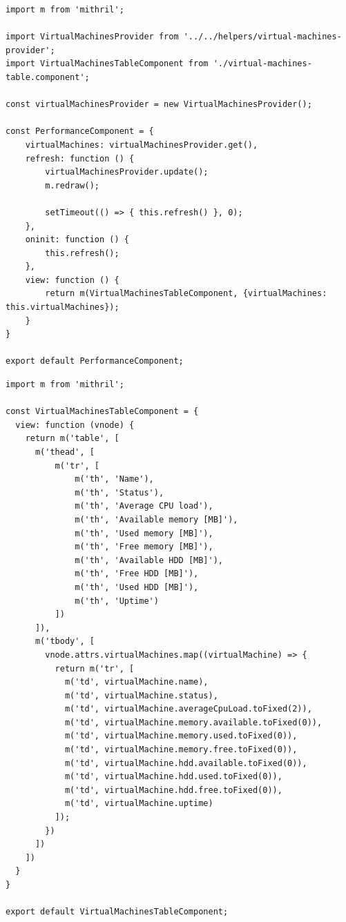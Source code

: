 \documentclass[polish, twoside, 12pt]{mwart}
\begin{document}
\begin{lstlisting}[caption=Główny komponent]
import m from 'mithril';

import VirtualMachinesProvider from '../../helpers/virtual-machines-provider';
import VirtualMachinesTableComponent from './virtual-machines-table.component';

const virtualMachinesProvider = new VirtualMachinesProvider();

const PerformanceComponent = {
    virtualMachines: virtualMachinesProvider.get(),
    refresh: function () {
        virtualMachinesProvider.update();
        m.redraw();

        setTimeout(() => { this.refresh() }, 0);
    },
    oninit: function () {
        this.refresh();
    },
    view: function () {
        return m(VirtualMachinesTableComponent, {virtualMachines: this.virtualMachines});
    }
}

export default PerformanceComponent;
\end{lstlisting}

\begin{lstlisting}[caption=Komponent tabeli]
import m from 'mithril';

const VirtualMachinesTableComponent = {
  view: function (vnode) {
    return m('table', [
      m('thead', [
          m('tr', [
              m('th', 'Name'),
              m('th', 'Status'),
              m('th', 'Average CPU load'),
              m('th', 'Available memory [MB]'),
              m('th', 'Used memory [MB]'),
              m('th', 'Free memory [MB]'),
              m('th', 'Available HDD [MB]'),
              m('th', 'Free HDD [MB]'),
              m('th', 'Used HDD [MB]'),
              m('th', 'Uptime')
          ])
      ]),
      m('tbody', [
        vnode.attrs.virtualMachines.map((virtualMachine) => {
          return m('tr', [
            m('td', virtualMachine.name),
            m('td', virtualMachine.status),
            m('td', virtualMachine.averageCpuLoad.toFixed(2)),
            m('td', virtualMachine.memory.available.toFixed(0)),
            m('td', virtualMachine.memory.used.toFixed(0)),
            m('td', virtualMachine.memory.free.toFixed(0)),
            m('td', virtualMachine.hdd.available.toFixed(0)),
            m('td', virtualMachine.hdd.used.toFixed(0)),
            m('td', virtualMachine.hdd.free.toFixed(0)),
            m('td', virtualMachine.uptime)
          ]);
        })
      ])
    ])
  }
}

export default VirtualMachinesTableComponent;
\end{lstlisting}
\end{document}
